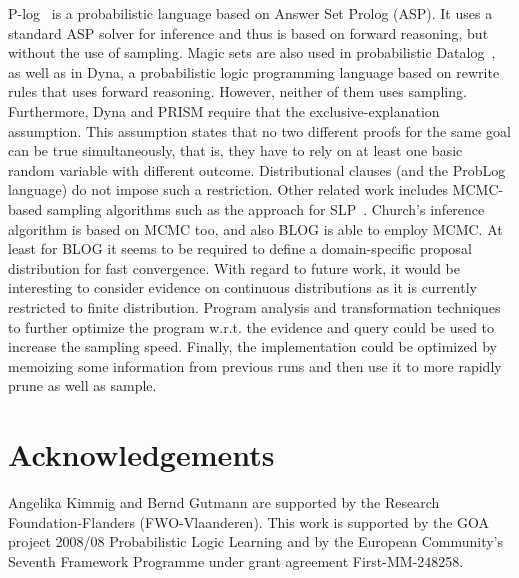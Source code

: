 \documentclass{tlp}
\begin{document}
P-log~\cite{Baral09} is a probabilistic language based on Answer Set
Prolog (ASP). It uses a standard ASP solver for inference and thus is
based on forward reasoning, but without the use of sampling.  Magic
sets are also used in probabilistic Datalog~\cite{Fuhr00}, as well as
in Dyna, a probabilistic logic programming language \cite{Eisner05}
based on rewrite rules that uses forward reasoning. However, neither
of them uses sampling. Furthermore, Dyna and PRISM require that the
exclusive-explanation assumption.  This assumption states that no two
different proofs for the same goal can be true simultaneously, that
is, they have to rely on at least one basic random variable with
different outcome. Distributional clauses (and the ProbLog language)
do not impose such a restriction.  Other related work includes
MCMC-based sampling algorithms such as the approach for
SLP~\cite{cussensmc}.  Church's inference algorithm is based on MCMC
too, and also BLOG is able to employ MCMC.  At least for BLOG it seems
to be required to define a domain-specific proposal distribution for
fast convergence.  With regard to future work, it would be interesting
to consider evidence on continuous distributions as it is currently
restricted to finite distribution. Program analysis and transformation
techniques to further optimize the program w.r.t. the evidence and
query could be used to increase the sampling speed.  Finally, the
implementation could be optimized by memoizing some information from
previous runs and then use it to more rapidly prune as well as sample.


\section*{Acknowledgements} 

Angelika Kimmig and Bernd Gutmann are supported by the Research
Foundation-Flanders (FWO-Vlaanderen). This work is supported by the
GOA project 2008/08 Probabilistic Logic Learning and by the European
Community's Seventh Framework Programme under grant agreement
First-MM-248258.



\newpage 



\end{document}
